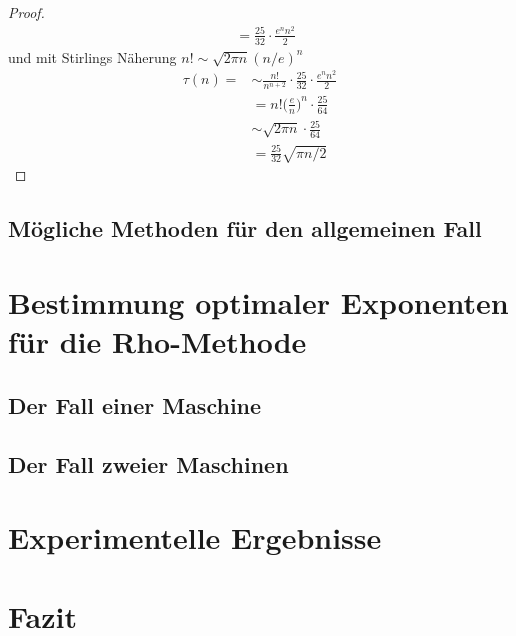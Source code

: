 \documentclass[a4paper, 10pt, ngerman]{article}
\begin{document}
\begin{proof}
\begin{align*}
         & = \frac {25} {32} \cdot \frac {e^n n^2} {2}
    \end{align*}
    und mit Stirlings Näherung $n! \sim \sqrt{2\pi n} (n/e)^n$
    \begin{align*}
        \tau(n) =
         & \sim \frac {n!}{n^{n + 2}} \cdot \frac {25} {32} \cdot \frac {e^n n^2} 2 \\
         & = n! \bigg (\frac {e} {n} \bigg )^n \cdot \frac {25} {64}                \\
         & \sim \sqrt {2 \pi n} \cdot \frac {25}{64}                                \\
         & = \frac {25} {32} \sqrt{\pi n/2}
    \end{align*}
\end{proof}

\subsection{Mögliche Methoden für den allgemeinen Fall}

\section{Bestimmung optimaler Exponenten für die Rho-Methode}

\subsection{Der Fall einer Maschine}

\subsection{Der Fall zweier Maschinen}

\section{Experimentelle Ergebnisse}\label{sec:ex}

\section{Fazit}

\printbibliography
\end{document}
